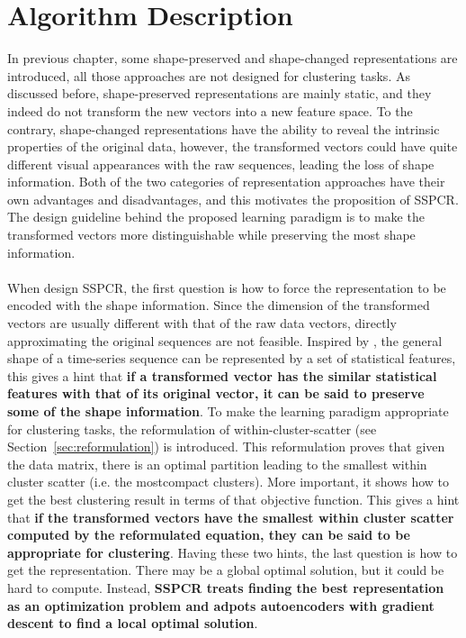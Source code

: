 \section{Algorithm Description}
In previous chapter, some shape-preserved and shape-changed representations are introduced, all those approaches are not designed for clustering tasks. As discussed before, shape-preserved representations are mainly static, and they indeed do not transform the new vectors into a new feature space. To the contrary, shape-changed representations have the ability to reveal the intrinsic properties of the original data, however, the transformed vectors could have quite different visual appearances with the raw sequences, leading the loss of shape information. Both of the two categories of representation approaches have their own advantages and disadvantages, and this motivates the proposition of SSPCR. The design guideline behind the proposed learning paradigm is to make the transformed vectors more distinguishable while preserving the most shape information.\\
\\When design SSPCR, the first question is how to force the representation to be encoded with the shape information. Since the dimension of the transformed vectors are usually different with that of the raw data vectors, directly approximating the original sequences are not feasible. Inspired by \cite{nanopoulos2001feature}, the general shape of a time-series sequence can be represented by a set of statistical features, this gives a hint that \textbf{if a transformed vector has the similar statistical features with that of its original vector, it can be said to preserve some of the shape information}. To make the learning paradigm appropriate for clustering tasks, the reformulation of within-cluster-scatter (see Section~\ref{sec:reformulation}) is introduced. This reformulation proves that given the data matrix, there is an optimal partition leading to the smallest within cluster scatter (i.e. the mostcompact clusters). More important, it shows how to get the best clustering result in terms of that objective function. This gives a hint that \textbf{if the transformed vectors have the smallest within cluster scatter computed by the reformulated equation, they can be said to be appropriate for clustering}. Having these two hints, the last question is how to get the representation. There may be a global optimal solution, but it could be hard to compute. Instead, \textbf{SSPCR treats finding the best representation as an optimization problem and adpots autoencoders with gradient descent to find a local optimal solution}.\\
